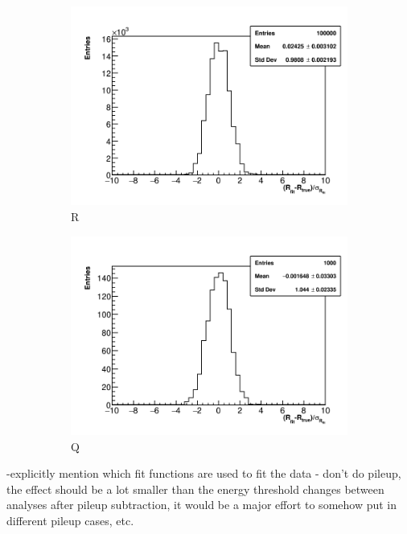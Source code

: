 \begin{figure}[]
    \begin{subfigure}[t]{0.45\textwidth}
        \centering
        \includegraphics[width=\textwidth]{Rpull_RMethod}
        \caption{R}
    \end{subfigure}
    \hspace{1mm}
    \begin{subfigure}[t]{0.45\textwidth}
        \centering
        \includegraphics[width=\textwidth]{Rpull_QMethod}
        \caption{Q}
    \end{subfigure}
\caption[]{}
\label{fig:}
\end{figure}




-explicitly mention which fit functions are used to fit the data
- don't do pileup, the effect should be a lot smaller than the energy threshold changes between analyses after pileup subtraction, it would be a major effort to somehow put in different pileup cases, etc.

